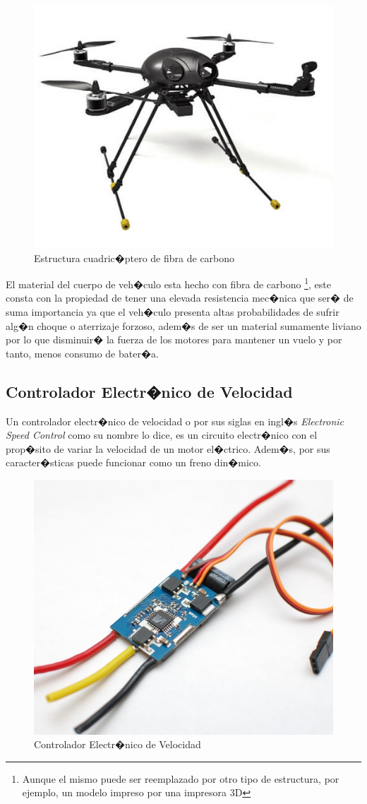 		\begin{figure}[h!]
			\centering
			\includegraphics[width=0.4\linewidth, height=0.25\textheight]{Imagenes/estrucuadricoptero}
			\caption{Estructura cuadric�ptero de fibra de carbono}
			\label{fig:estrucuadricoptero}
		\end{figure}

		El material del cuerpo de veh�culo esta hecho con fibra de carbono \footnote{Aunque el mismo puede ser reemplazado por otro tipo de estructura, por ejemplo, un modelo impreso por una impresora 3D}, este consta con la propiedad de tener una elevada resistencia mec�nica que ser� de suma importancia ya que el veh�culo presenta altas probabilidades de sufrir alg�n choque o aterrizaje forzoso, adem�s de ser un material sumamente liviano por lo que disminuir� la fuerza de los motores para mantener un vuelo y por tanto, menos consumo de bater�a.
		

	\subsection{Controlador Electr�nico de Velocidad}
		Un controlador electr�nico de velocidad o por sus siglas en ingl�s \textit{Electronic Speed Control} como su nombre lo dice, es un circuito electr�nico con el prop�sito de variar la velocidad de un motor el�ctrico. Adem�s, por sus caracter�sticas puede funcionar como un freno din�mico.

		\begin{figure}[h!]
			\centering
			\includegraphics[width=0.4\linewidth, height=0.1\textheight]{Imagenes/esc}
			\caption{Controlador Electr�nico de Velocidad}
			\label{fig:esc}
		\end{figure}

